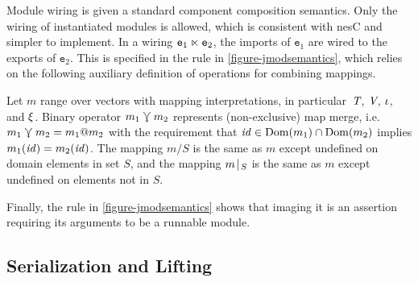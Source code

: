 Module wiring is given a standard component composition semantics. Only the wiring of
instantiated modules is allowed, which is consistent with nesC and simpler to implement. In a
wiring $\texttt{e}_1 \ltimes \texttt{e}_2$, the imports of $\texttt{e}_1$ are wired to the
exports of $\texttt{e}_2$. This is specified in the  rule in
\autoref{figure-jmodsemantics}, which relies on the following auxiliary definition of operations
for combining mappings.
\begin{definition}
  Let $m$ range over vectors with mapping interpretations, in particular~$\textit{T}$, $\textit{V}$,
  $\iota$, and $\xi$. Binary operator $m_1\curlyveedownarrow m_2$ represents (non-exclusive)
  map merge, i.e.~$m_1 \curlyveedownarrow m_2 = m_1 @ m_2$ with the requirement that $\mathit{id}\in
  {\rm Dom}(m_1)\cap{\rm Dom}(m_2)$ implies $m_1(\mathit{id}) = m_2(\mathit{id})$. The mapping $m / S$ is
  the same as $m$ except undefined on domain elements in set $S$, and the mapping
  $m\!\mid\!_{S}$ is the same as $m$ except undefined on elements not in ${S}$.
\end{definition}
Finally, the  rule in \autoref{figure-jmodsemantics} shows that imaging it is
an assertion requiring its arguments to be a runnable module.

\subsection{Serialization and Lifting}
\label{section-serialization}

